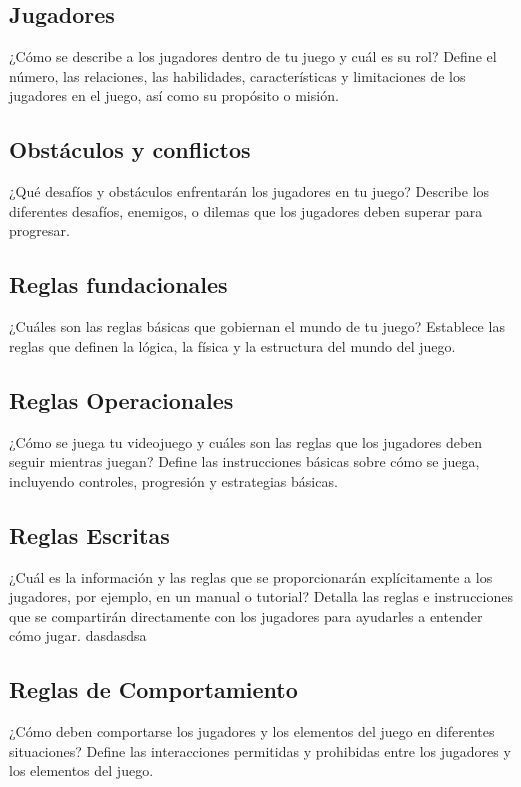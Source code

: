     \subsection{Jugadores}
    ¿Cómo se describe a los jugadores dentro de tu juego y cuál es su rol?
    Define el número, las relaciones, las habilidades, características y limitaciones de los jugadores en el juego, así como su propósito o misión.

    \subsection{Obstáculos y conflictos}
    ¿Qué desafíos y obstáculos enfrentarán los jugadores en tu juego?
    Describe los diferentes desafíos, enemigos, o dilemas que los jugadores deben superar para progresar.

    \subsection{Reglas fundacionales}
    ¿Cuáles son las reglas básicas que gobiernan el mundo de tu juego?
    Establece las reglas que definen la lógica, la física y la estructura del mundo del juego.

    \subsection{Reglas Operacionales}
    ¿Cómo se juega tu videojuego y cuáles son las reglas que los jugadores deben seguir mientras juegan?
    Define las instrucciones básicas sobre cómo se juega, incluyendo controles, progresión y estrategias básicas.

    \subsection{Reglas Escritas}
    ¿Cuál es la información y las reglas que se proporcionarán explícitamente a los jugadores, por ejemplo, en un manual o tutorial?
    Detalla las reglas e instrucciones que se compartirán directamente con los jugadores para ayudarles a entender cómo jugar.
    dasdasdsa
    \subsection{Reglas de Comportamiento}
    ¿Cómo deben comportarse los jugadores y los elementos del juego en diferentes situaciones?
    Define las interacciones permitidas y prohibidas entre los jugadores y los elementos del juego.

